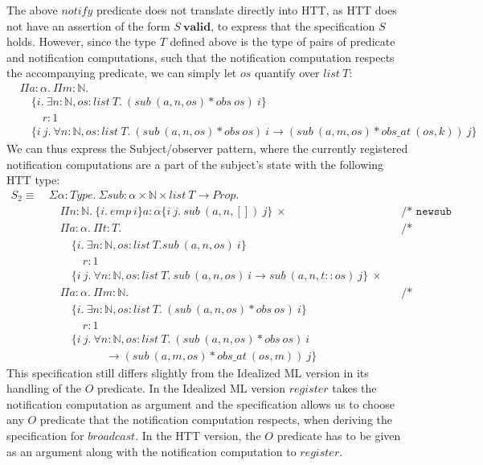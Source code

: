 \documentclass[a4paper,english]{article}
\newcommand{\N}[0]{\mathbb{N}}
\newcommand{\HPROP}[0]{Prop}
\newcommand{\TYPE}[0]{Type}
\newcommand{\LIST}[0]{list}
\newcommand{\VALID}[0]{\mathbf{valid}}
\newcommand{\pname}[1]{\texttt{/* #1 */}}
\begin{document}
The above $notify$ predicate does not translate directly into HTT, as HTT does
not have an assertion of the form $S\ \VALID$, to express that the
specification $S$ holds. However, since the type $T$ defined above is the type
of pairs of predicate and notification computations, such that the notification
computation respects the accompanying predicate, we can simply let $os$
quantify over $list\ T$:
\begin{align*}
&\Pi a : \alpha.\ \Pi m : \N.\\
&\quad\{ i.\ \exists n : \N, os : list\ T.\ (sub\ (a, n, os) * obs\ os)\ i \}\\
&\quad\quad r : 1\\
&\quad \{ i\ j.\ \forall n : \N, os : list\ T.\ (sub\ (a, n, os) * obs\ os)\ i \rightarrow (sub\ (a, m, os) * obs\_at\ (os, k))\ j \} 
\end{align*}
We can thus express the Subject/observer pattern, where the currently
registered notification computations are a part of the subject's state with the
following HTT type:
\begin{align*}
S_2 \equiv\ &\Sigma \alpha : \TYPE.\ \Sigma sub : \alpha \times \N \times \LIST\ T
\rightarrow \HPROP.\\
&\quad \Pi n : \N.\ \{ i.\ emp\ i \} a : \alpha \{ i\ j.\ sub\ (a, n, [])\ j \}\ \times && \pname{newsub}\\
&\quad \Pi a : \alpha.\ \Pi t : T. && \pname{register}\\
&\quad\quad\{ i.\ \exists n : \N, os : list\ T. sub\ (a, n, os)\ i \}\\
&\quad\quad\quad r : 1\\
&\quad\quad \{ i\ j.\ \forall n : \N, os : list\ T.\ sub\ (a, n, os)\ i \rightarrow sub\ (a, n, t::os)\ j
\}\ \times\\
&\quad \Pi a : \alpha.\ \Pi m : \N. && \pname{broadcast}\\
&\quad\quad\{ i.\ \exists n : \N, os : list\ T.\ (sub\ (a, n, os) * obs\ os)\ i \}\\
&\quad\quad\quad r : 1\\
&\quad\quad \{ i\ j.\ \forall n : \N, os : list\ T.\ (sub\ (a, n, os) * obs\ os)\ i\\
&\quad\quad\quad\quad\quad \rightarrow (sub\ (a, m, os) * obs\_at\ (os, m))\ j \}
\end{align*}
This specification still differs slightly from the Idealized ML version in its
handling of the $O$ predicate. In the Idealized ML version $register$ takes the
notification computation as argument and the specification allows us to choose
any $O$ predicate that the notification computation respects, when deriving the
specification for $broadcast$. In the HTT version, the $O$ predicate has to be
given as an argument along with the notification computation to $register$. 
\end{document}
